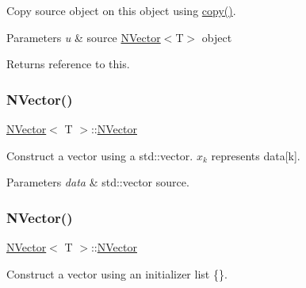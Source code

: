 Copy source object on this object using {\ttfamily \mbox{\hyperlink{class_n_vector_a67128d2ff536b8ccd7a95cb680bd0431}{copy()}}}. 


\begin{DoxyParams}{Parameters}
{\em u} & source {\ttfamily \mbox{\hyperlink{class_n_vector}{N\+Vector}}$<$T$>$} object \\
\hline
\end{DoxyParams}
\begin{DoxyReturn}{Returns}
reference to {\ttfamily this}. 
\end{DoxyReturn}
\mbox{\label{class_vector3_a786957fb5d1d9bdec7e6ced65bce03c0}} 
\subsubsection{\texorpdfstring{NVector()}{NVector()}\hspace{0.1cm}{\footnotesize\ttfamily [1/5]}}
{\footnotesize\ttfamily \mbox{\hyperlink{class_n_vector}{N\+Vector}}$<$ T $>$\+::\mbox{\hyperlink{class_n_vector}{N\+Vector}}\hspace{0.3cm}{\ttfamily [inline]}}



Construct a vector using a {\ttfamily std\+::vector}. $ x_k $ represents {\ttfamily data\mbox{[}k\mbox{]}}. 


\begin{DoxyParams}{Parameters}
{\em data} & {\ttfamily std\+::vector} source. \\
\hline
\end{DoxyParams}
\mbox{\label{class_vector3_a44c7b132c668c2aac890b66fe7ab0262}} 
\subsubsection{\texorpdfstring{NVector()}{NVector()}\hspace{0.1cm}{\footnotesize\ttfamily [2/5]}}
{\footnotesize\ttfamily \mbox{\hyperlink{class_n_vector}{N\+Vector}}$<$ T $>$\+::\mbox{\hyperlink{class_n_vector}{N\+Vector}}\hspace{0.3cm}{\ttfamily [inline]}}



Construct a vector using an initializer list {\ttfamily \{\}}. 


